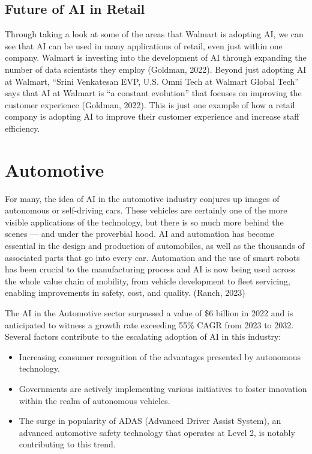 \documentclass[
]{article}
\begin{document}
\hypertarget{future-of-ai-in-retail}{%
\subsection{Future of AI in Retail}\label{future-of-ai-in-retail}}

Through taking a look at some of the areas that Walmart is adopting AI, we can see that AI can be used in many applications of retail, even just within one company. Walmart is investing into the development of AI through expanding the number of data scientists they employ (Goldman, 2022). Beyond just adopting AI at Walmart, ``Srini Venkatesan EVP, U.S. Omni Tech at Walmart Global Tech'' says that AI at Walmart is ``a constant evolution'' that focuses on improving the customer experience (Goldman, 2022). This is just one example of how a retail company is adopting AI to improve their customer experience and increase staff efficiency.

\hypertarget{automotive}{%
\section{Automotive}\label{automotive}}

For many, the idea of AI in the automotive industry conjures up images of autonomous or self-driving cars. These vehicles are certainly one of the more visible applications of the technology, but there is so much more behind the scenes --- and under the proverbial hood. AI and automation has become essential in the design and production of automobiles, as well as the thousands of associated parts that go into every car. Automation and the use of smart robots has been crucial to the manufacturing process and AI is now being used across the whole value chain of mobility, from vehicle development to fleet servicing, enabling improvements in safety, cost, and quality. (Ranch, 2023)

The AI in the Automotive sector surpassed a value of \$6 billion in 2022 and is anticipated to witness a growth rate exceeding 55\% CAGR from 2023 to 2032. Several factors contribute to the escalating adoption of AI in this industry:

\begin{itemize}
\item
  Increasing consumer recognition of the advantages presented by autonomous technology.
\item
  Governments are actively implementing various initiatives to foster innovation within the realm of autonomous vehicles.
\item
  The surge in popularity of ADAS (Advanced Driver Assist System), an advanced automotive safety technology that operates at Level 2, is notably contributing to this trend.
\end{itemize}
\end{document}
